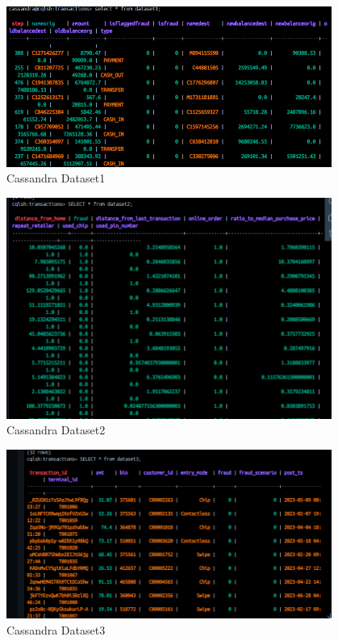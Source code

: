 \documentclass[12pt,a4paper, hidelinks]{article}
\begin{document}
\begin{figure}[htbp]
  \centering
  \includegraphics[width=0.95\textwidth]{images/m2-dataset-1.png}
  \caption{Cassandra Dataset1}
  \label{fig:cassandra1}
\end{figure}


\begin{figure}[htbp]
  \centering
  \includegraphics[width=0.95\textwidth]{images/m2-dataset-2.png}
  \caption{Cassandra Dataset2}
  \label{fig:cassandra2}
\end{figure}


\begin{figure}[htbp]
  \centering
  \includegraphics[width=0.95\textwidth]{images/m2-dataset-3.png}
  \caption{Cassandra Dataset3}
  \label{fig:cassandra3}
\end{figure}
\end{document}
